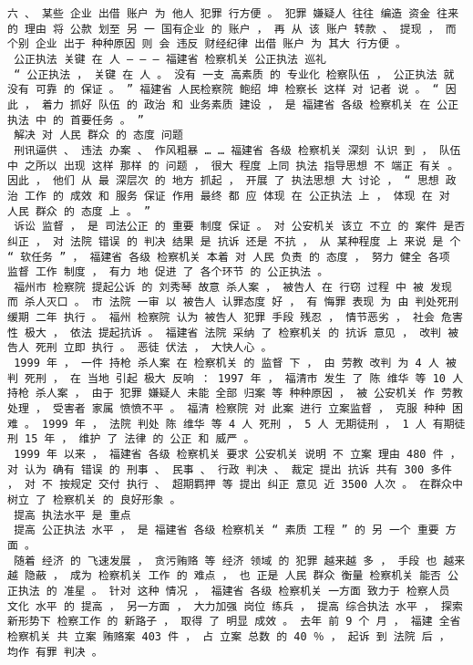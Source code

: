 \documentclass{article}
\begin{document}
\begin{Verbatim}[commandchars=\\\{\}]
 六 、 某些 企业 出借 账户 为 他人 犯罪 行方便 。 犯罪 嫌疑人 往往 编造 资金 往来 的 理由 将 公款 划至 另 一 国有企业 的 账户 ， 再 从 该 账户 转款 、 提现 ， 而 个别 企业 出于 种种原因 则 会 违反 财经纪律 出借 账户 为 其大 行方便 。 
 公正执法 关键 在 人 — — — 福建省 检察机关 公正执法 巡礼 
 “ 公正执法 ， 关键 在 人 。 没有 一支 高素质 的 专业化 检察队伍 ， 公正执法 就 没有 可靠 的 保证 。 ” 福建省 人民检察院 鲍绍 坤 检察长 这样 对 记者 说 。 “ 因此 ， 着力 抓好 队伍 的 政治 和 业务素质 建设 ， 是 福建省 各级 检察机关 在 公正执法 中 的 首要任务 。 ” 
 解决 对 人民 群众 的 态度 问题 
 刑讯逼供 、 违法 办案 、 作风粗暴 … … 福建省 各级 检察机关 深刻 认识 到 ， 队伍 中 之所以 出现 这样 那样 的 问题 ， 很大 程度 上同 执法 指导思想 不 端正 有关 。 因此 ， 他们 从 最 深层次 的 地方 抓起 ， 开展 了 执法思想 大 讨论 ， “ 思想 政治 工作 的 成效 和 服务 保证 作用 最终 都 应 体现 在 公正执法 上 ， 体现 在 对 人民 群众 的 态度 上 。 ” 
 诉讼 监督 ， 是 司法公正 的 重要 制度 保证 。 对 公安机关 该立 不立 的 案件 是否 纠正 ， 对 法院 错误 的 判决 结果 是 抗诉 还是 不抗 ， 从 某种程度 上 来说 是 个 “ 软任务 ” ， 福建省 各级 检察机关 本着 对 人民 负责 的 态度 ， 努力 健全 各项 监督 工作 制度 ， 有力 地 促进 了 各个环节 的 公正执法 。 
 福州市 检察院 提起公诉 的 刘秀琴 故意 杀人案 ， 被告人 在 行窃 过程 中 被 发现 而 杀人灭口 。 市 法院 一审 以 被告人 认罪态度 好 ， 有 悔罪 表现 为 由 判处死刑 缓期 二年 执行 。 福州 检察院 认为 被告人 犯罪 手段 残忍 ， 情节恶劣 ， 社会 危害性 极大 ， 依法 提起抗诉 。 福建省 法院 采纳 了 检察机关 的 抗诉 意见 ， 改判 被告人 死刑 立即 执行 。 恶徒 伏法 ， 大快人心 。 
 1999 年 ， 一件 持枪 杀人案 在 检察机关 的 监督 下 ， 由 劳教 改判 为 4 人 被判 死刑 ， 在 当地 引起 极大 反响 ： 1997 年 ， 福清市 发生 了 陈 维华 等 10 人 持枪 杀人案 ， 由于 犯罪 嫌疑人 未能 全部 归案 等 种种原因 ， 被 公安机关 作 劳教 处理 ， 受害者 家属 愤愤不平 。 福清 检察院 对 此案 进行 立案监督 ， 克服 种种 困难 。 1999 年 ， 法院 判处 陈 维华 等 4 人 死刑 ， 5 人 无期徒刑 ， 1 人 有期徒刑 15 年 ， 维护 了 法律 的 公正 和 威严 。 
 1999 年 以来 ， 福建省 各级 检察机关 要求 公安机关 说明 不 立案 理由 480 件 ， 对 认为 确有 错误 的 刑事 、 民事 、 行政 判决 、 裁定 提出 抗诉 共有 300 多件 ， 对 不 按规定 交付 执行 、 超期羁押 等 提出 纠正 意见 近 3500 人次 。 在群众中 树立 了 检察机关 的 良好形象 。 
 提高 执法水平 是 重点 
 提高 公正执法 水平 ， 是 福建省 各级 检察机关 “ 素质 工程 ” 的 另 一个 重要 方面 。 
 随着 经济 的 飞速发展 ， 贪污贿赂 等 经济 领域 的 犯罪 越来越 多 ， 手段 也 越来越 隐蔽 ， 成为 检察机关 工作 的 难点 ， 也 正是 人民 群众 衡量 检察机关 能否 公正执法 的 准星 。 针对 这种 情况 ， 福建省 各级 检察机关 一方面 致力于 检察人员 文化 水平 的 提高 ， 另一方面 ， 大力加强 岗位 练兵 ， 提高 综合执法 水平 ， 探索 新形势下 检察工作 的 新路子 ， 取得 了 明显 成效 。 去年 前 9 个 月 ， 福建 全省 检察机关 共 立案 贿赂案 403 件 ， 占 立案 总数 的 40 ％ ， 起诉 到 法院 后 ， 均作 有罪 判决 。 

\end{Verbatim}
\end{document}
